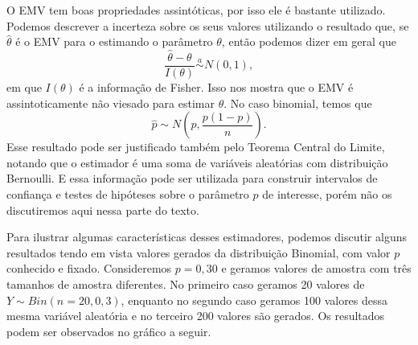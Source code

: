 \documentclass[]{book}
\begin{document}
O EMV tem boas propriedades assintóticas, por isso ele é bastante utilizado. Podemos descrever a incerteza sobre os seus valores utilizando o resultado que, se \(\hat{\theta}\) é o EMV para o estimando o parâmetro \(\theta\), então podemos dizer em geral que\\
\[
\frac{\hat{\theta} - \theta}{I(\theta)} \stackrel{a}{\sim} N(0, 1),
\]
em que \(I(\theta)\) é a informação de Fisher. Isso nos mostra que o EMV é assintoticamente não viesado para estimar \(\theta\). No caso binomial, temos que
\[
\hat{p} \sim N\left(p, \frac{p(1-p)}{n} \right).
\]
Esse resultado pode ser justificado também pelo Teorema Central do Limite, notando que o estimador é uma soma de variáveis aleatórias com distribuição Bernoulli. E essa informação pode ser utilizada para construir intervalos de confiança e testes de hipóteses sobre o parâmetro \(p\) de interesse, porém não os discutiremos aqui nessa parte do texto.

Para ilustrar algumas características desses estimadores, podemos discutir alguns resultados tendo em vista valores gerados da distribuição Binomial, com valor \(p\) conhecido e fixado. Consideremos \(p = 0,30\) e geramos valores de amostra com três tamanhos de amostra diferentes. No primeiro caso geramos 20 valores de \(Y \sim Bin(n = 20, 0,3)\), enquanto no segundo caso geramos 100 valores dessa mesma variável aleatória e no terceiro 200 valores são gerados. Os resultados podem ser observados no gráfico a seguir.
\end{document}
